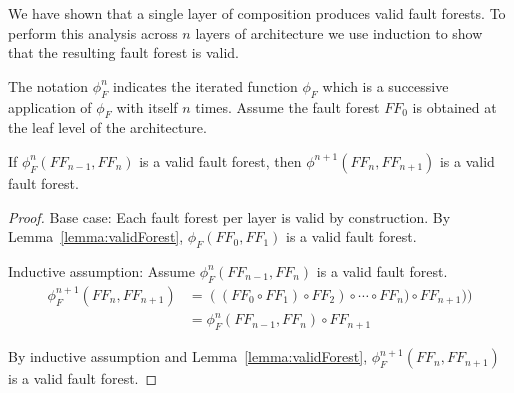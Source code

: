 We have shown that a single layer of composition produces valid fault forests. To perform this analysis across $n$ layers of architecture we use induction to show that the resulting fault forest is valid. 

The notation $\phi_F^n$ indicates the iterated function $\phi_F$ which is a successive application of $\phi_F$ with itself $n$ times. Assume the fault forest $\mathit{FF_0}$ is obtained at the leaf level of the architecture.

\begin{theorem} If $\phi_F^n(\mathit{FF_{n-1}}, \mathit{FF_n})$ is a valid fault forest, then $\phi^{n+1}(\mathit{FF_n}, \mathit{FF_{n+1}})$ is a valid fault forest.
\begin{proof}

Base case: Each fault forest per layer is valid by construction. By Lemma~\ref{lemma:validForest}, $\phi_F(\mathit{FF_0}, \mathit{FF_1})$ is a valid fault forest.

Inductive assumption: Assume $\phi_F^n(\mathit{FF_{n-1}}, \mathit{FF_n})$ is a valid fault forest.
\begin{equation*}
\begin{split}
\phi_F^{n+1}(\mathit{FF_n}, \mathit{FF_{n+1}}) &= ((\mathit{FF_0} \circ \mathit{FF_1}) \circ \mathit{FF}_2) \circ \cdots \circ \mathit{FF_n}) \circ \mathit{FF_{n+1}})) \\
  &= \phi_F^n(\mathit{FF_{n-1}}, \mathit{FF_n}) \circ \mathit{FF_{n+1}}
\end{split}
\end{equation*}


By inductive assumption and Lemma~\ref{lemma:validForest}, $\phi_F^{n+1}(\mathit{FF_n}, \mathit{FF_{n+1}})$ is a valid fault forest.

\end{proof}
\label{thm:indForest}
\end{theorem}

